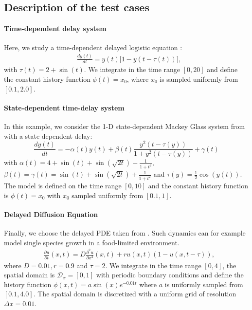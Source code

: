 \documentclass[pmlr]{jmlr}%
\begin{document}
\subsection{Description of the test cases}

\paragraph{Time-dependent delay system} Here, we study a time-dependent delayed logistic equation \citep{arino2006alternative}:
%
\begin{equation}
\begin{aligned}
&\frac{d y(t)}{dt} = y(t) \bigl[ 1 -y(t-\tau(t))\bigr],
\end{aligned}
\end{equation}
%
with $\tau(t) = 2 + \sin(t)$. We integrate in the time range $[0,20]$ and define the constant history function $\phi(t) = x_0$, where $x_0$ is sampled uniformly from $[0.1,2.0]$.

\paragraph{State-dependent time-delay system} In this example, we consider the 1-D state-dependent Mackey Glass system from \citet{state_dependent_mg} with a state-dependent delay:
%
\begin{equation}
\frac{d y(t)}{dt} = -\alpha(t) y(t) + \beta(t) \frac{ y^2(t - \tau(y))}{1 + y^2(t - \tau(y))} + \gamma(t)
\end{equation}
%
with $\alpha(t) = 4 + \sin(t) + \sin(\sqrt{2t}) + \frac{1}{1 + t^2}$, $\beta(t) = \gamma(t) = \sin(t) + \sin(\sqrt{2t}) + \frac{1}{1 + t^2}$ and $\tau(y) = \frac{1}{2} \cos(y(t))$. The model is defined on the time range $[0,10]$ and the constant history function is $\phi(t) = x_0$ with $x_0$ sampled uniformly from $[0.1,1]$.

\paragraph{Delayed Diffusion Equation} Finally, we choose the delayed PDE taken from \citet{arino2009delay}. Such dynamics can for example model single species growth in a food-limited environment.
%
\begin{equation}
\begin{aligned}
&\frac{\partial u}{\partial t}(x,t) = D \frac{\partial^2 u}{\partial x^2}(x,t) + r u(x,t) \left( 1 - u(x,t-\tau) \right),
\end{aligned}
\end{equation}
%
where $D=0.01, r=0.9$ and $\tau=2$. We integrate in the time range $[0,4]$, the spatial domain is $\mathcal{D}_x = [0,1]$ with periodic boundary conditions and define the history function $\phi(x, t) = a \sin(x) e^{-0.01t} $ where $a$ is uniformly sampled from $[0.1,4.0]$. The spatial domain is discretized with a uniform grid of resolution $\Delta x=0.01$.
\end{document}
